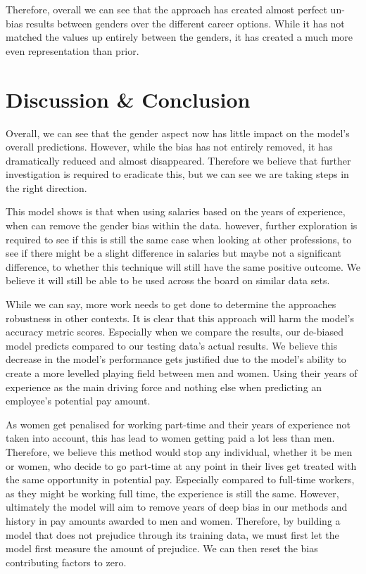 \documentclass{sigchi}
\begin{document}
	Therefore, overall we can see that the approach has created almost perfect un-bias results between genders over the different career options. While it has not matched the values up entirely between the genders, it has created a much more even representation than prior. 


\section{Discussion \& Conclusion}
	Overall, we can see that the gender aspect now has little impact on the model's overall predictions. However, while the bias has not entirely removed, it has dramatically reduced and almost disappeared. Therefore we believe that further investigation is required to eradicate this, but we can see we are taking steps in the right direction.  
	
	This model shows is that when using salaries based on the years of experience, when can remove the gender bias within the data. however, further exploration is required to see if this is still the same case when looking at other professions, to see if there might be a slight difference in salaries but maybe not a significant difference, to whether this technique will still have the same positive outcome. We believe it will still be able to be used across the board on similar data sets.
	
	While we can say, more work needs to get done to determine the approaches robustness in other contexts. It is clear that this approach will harm the model's accuracy metric scores. Especially when we compare the results, our de-biased model predicts compared to our testing data's actual results. We believe this decrease in the model's performance gets justified due to the model's ability to create a more levelled playing field between men and women. Using their years of experience as the main driving force and nothing else when predicting an employee's potential pay amount. 
	
	As women get penalised for working part-time and their years of experience not taken into account, this has lead to women getting paid a lot less than men. Therefore, we believe this method would stop any individual, whether it be men or women, who decide to go part-time at any point in their lives get treated with the same opportunity in potential pay. Especially compared to full-time workers, as they might be working full time, the experience is still the same. However, ultimately the model will aim to remove years of deep bias in our methods and history in pay amounts awarded to men and women. Therefore, by building a model that does not prejudice through its training data, we must first let the model first measure the amount of prejudice. We can then reset the bias contributing factors to zero.
	\newpage

\newpage
\balance{}


\end{document}
